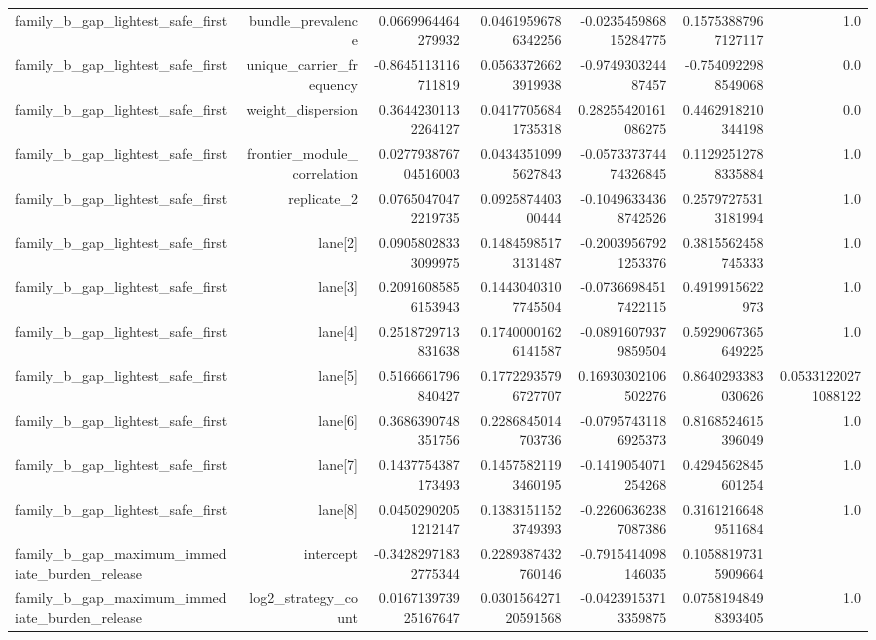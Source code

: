 {\begin{longtable}{lrrrrrr}
family\_b\_gap\_lightest\_safe\_first & bundle\_prevalence & 0.0669964464279932 & 0.04619596786342256 & -0.023545986815284775 & 0.15753887967127117 & 1.0 \\
family\_b\_gap\_lightest\_safe\_first & unique\_carrier\_frequency & -0.8645113116711819 & 0.05633726623919938 & -0.974930324487457 & -0.7540922988549068 & 0.0 \\
family\_b\_gap\_lightest\_safe\_first & weight\_dispersion & 0.36442301132264127 & 0.04177056841735318 & 0.28255420161086275 & 0.4462918210344198 & 0.0 \\
family\_b\_gap\_lightest\_safe\_first & frontier\_module\_correlation & 0.027793876704516003 & 0.04343510995627843 & -0.057337374474326845 & 0.11292512788335884 & 1.0 \\
family\_b\_gap\_lightest\_safe\_first & replicate\_2 & 0.07650470472219735 & 0.092587440300444 & -0.10496334368742526 & 0.25797275313181994 & 1.0 \\
family\_b\_gap\_lightest\_safe\_first & lane[2] & 0.09058028333099975 & 0.14845985173131487 & -0.20039567921253376 & 0.3815562458745333 & 1.0 \\
family\_b\_gap\_lightest\_safe\_first & lane[3] & 0.20916085856153943 & 0.14430403107745504 & -0.07366984517422115 & 0.4919915622973 & 1.0 \\
family\_b\_gap\_lightest\_safe\_first & lane[4] & 0.2518729713831638 & 0.17400001626141587 & -0.08916079379859504 & 0.5929067365649225 & 1.0 \\
family\_b\_gap\_lightest\_safe\_first & lane[5] & 0.5166661796840427 & 0.17722935796727707 & 0.16930302106502276 & 0.8640293383030626 & 0.05331220271088122 \\
family\_b\_gap\_lightest\_safe\_first & lane[6] & 0.3686390748351756 & 0.2286845014703736 & -0.07957431186925373 & 0.8168524615396049 & 1.0 \\
family\_b\_gap\_lightest\_safe\_first & lane[7] & 0.1437754387173493 & 0.14575821193460195 & -0.1419054071254268 & 0.4294562845601254 & 1.0 \\
family\_b\_gap\_lightest\_safe\_first & lane[8] & 0.04502902051212147 & 0.13831511523749393 & -0.22606362387087386 & 0.31612166489511684 & 1.0 \\
family\_b\_gap\_maximum\_immediate\_burden\_release & intercept & -0.34282971832775344 & 0.2289387432760146 & -0.7915414098146035 & 0.10588197315909664 &  \\
family\_b\_gap\_maximum\_immediate\_burden\_release & log2\_strategy\_count & 0.016713973925167647 & 0.030156427120591568 & -0.04239153713359875 & 0.07581948498393405 & 1.0 \\

\end{longtable}}
